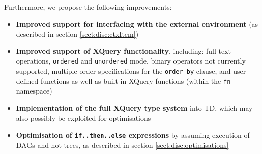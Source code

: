 Furthermore, we propose the following improvements:
\begin{itemize}
  \item \textbf{Improved support for interfacing with the external environment} (as
  described in section \ref{sect:disc:ctxItem})
  \item \textbf{Improved support of XQuery functionality}, including: full-text
  operations, \texttt{ordered} and \texttt{unordered} mode, binary operators not currently supported,
  multiple order specifications for the \texttt{order by}-clause, and user-defined
  functions as well as built-in XQuery functions (within the \texttt{fn} namespace)
  \item \textbf{Implementation of the full XQuery type system} into TD, which may also
  possibly be exploited for optimisations
  \item \textbf{Optimisation of \texttt{if..then..else} expressions} by assuming
  execution of DAGs and not trees, as described in section
  \ref{sect:disc:optimisations}
\end{itemize}